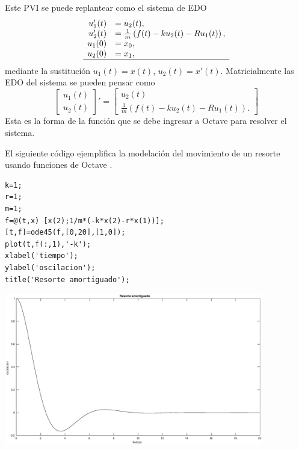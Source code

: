\documentclass[letter,11pt]{article}
\newcommand{\octave}{{\sc Octave} }
\begin{document}
Este PVI se puede replantear como el sistema de EDO
$$
\begin{array}{rl}
u_1'(t) & =u_2(t),\\
u_2'(t) & =\frac{1}{m} \left( f(t)-ku_2(t)-Ru_1(t)\right),\\
u_1(0) & =x_0,\\
u_2(0) & =x_1,\\ \hline
\end{array}
$$
mediante la sustituci\'on $u_1(t)=x(t)$, $u_2(t)=x'(t)$.  Matricialmente las EDO del sistema se pueden pensar como
$$
\begin{bmatrix}
u_1(t)\\u_2(t)
\end{bmatrix}'
=
\begin{bmatrix}
u_2(t)\\\frac{1}{m} \left( f(t)-ku_2(t)-Ru_1(t)\right).
\end{bmatrix}
$$
Esta es la forma de la funci\'on que se debe ingresar a \octave para resolver el sistema.

El siguiente c\'odigo ejemplifica la modelaci\'on del movimiento de un resorte usando funciones de  \octave.
\begin{lstlisting}
k=1;
r=1;
m=1;
f=@(t,x) [x(2);1/m*(-k*x(2)-r*x(1))];
[t,f]=ode45(f,[0,20],[1,0]);
plot(t,f(:,1),'-k');
xlabel('tiempo');
ylabel('oscilacion');
title('Resorte amortiguado');
\end{lstlisting}
\begin{center}
\includegraphics[width=0.85\textwidth]{eje5.eps}
\end{center}
\end{document}
